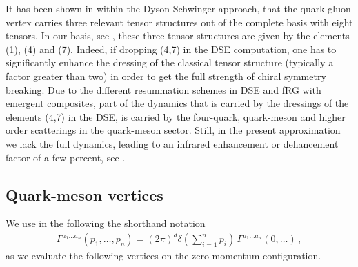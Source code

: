\documentclass[aps,twocolumn,prd,superscriptaddress]{revtex4-2}
\begin{document}
It has been shown in \cite{Gao:2021wun} within the Dyson-Schwinger approach, that the quark-gluon vertex carries three relevant tensor structures out of the complete basis with eight tensors. In our basis, see , these three tensor structures are given by the elements (1), (4) and (7). Indeed, if dropping (4,7) in the DSE computation, one has to significantly enhance the dressing of the classical tensor structure (typically a factor greater than two) in order to get the full strength of chiral symmetry breaking. Due to the different resummation schemes in DSE and fRG with emergent composites, part of the dynamics that is carried by the dressings of the elements (4,7) in the DSE, is carried by the four-quark, quark-meson and higher order scatterings in the quark-meson sector. Still, in the present approximation we lack the full dynamics, leading to an infrared enhancement or dehancement factor of a few percent, see . 


\subsection{Quark-meson vertices}
\label{app:QMVertices}

We use in the following the shorthand notation
%
\begin{align}
	\Gamma^{a_1\dots a_n}(p_1,\dots,p_n) = (2\pi)^d\delta\left(\sum_{i=1}^n p_i\right)\,\Gamma^{a_1\dots a_n}(0,\dots)\,,
\end{align}
%
as we evaluate the following vertices on the zero-momentum configuration.
\end{document}
